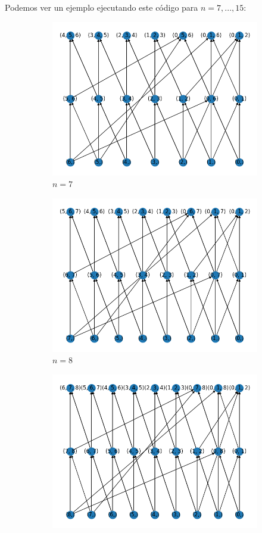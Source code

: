 Podemos ver un ejemplo ejecutando este código para $ n = 7,..., 15$:
\begin{figure}[h]
    \begin{subfigure}{.5\textwidth}
      \centering
      \includegraphics[width=.8\linewidth]{imagenes/7.png}
      \caption{$n = 7$}
    \end{subfigure}%
    \begin{subfigure}{.5\textwidth}
      \centering
      \includegraphics[width=.8\linewidth]{imagenes/8.png}
      \caption{$ n = 8 $}
    \end{subfigure}
    \begin{subfigure}{.5\textwidth}
        \centering
        \includegraphics[width=.8\linewidth]{imagenes/9.png}

\end{subfigure}
\end{figure}
